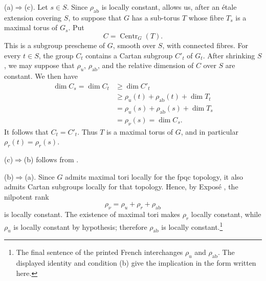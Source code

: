 \textup{(a)}\(\Rightarrow\)\textup{(c)}.
Let \(s\in S\). Since \(\rho_{\mathrm{ab}}\) is locally constant,
 allows us, after an étale extension covering \(S\),
to suppose that \(G\) has a sub-torus \(T\) whose fibre \(T_s\) is
a maximal torus of \(G_s\). Put
\[
  C=\operatorname{Centr}_G(T).
\]
This is a subgroup prescheme of \(G\), smooth over \(S\), with
connected fibres. For every \(t\in S\), the group \(C_t\) contains
a Cartan subgroup \(C'_t\) of \(G_t\). After shrinking \(S\), we
may suppose that \(\rho_u\), \(\rho_{\mathrm{ab}}\), and the
relative dimension of \(C\) over \(S\) are constant. We then have
\[
\begin{aligned}
  \dim C_s=\dim C_t
  &\geq \dim C'_t\\
  &\geq \rho_u(t)+\rho_{\mathrm{ab}}(t)+\dim T_t\\
  &=\rho_u(s)+\rho_{\mathrm{ab}}(s)+\dim T_s\\
  &=\rho_\nu(s)=\dim C_s.
\end{aligned}
\]
It follows that \(C_t=C'_t\). Thus \(T\) is a maximal torus of
\(G\), and in particular \(\rho_r(t)=\rho_r(s)\).

\textup{(c)}\(\Rightarrow\)\textup{(b)} follows from
.

\textup{(b)}\(\Rightarrow\)\textup{(a)}.
Since \(G\) admits maximal tori locally for the fpqc topology, it
also admits Cartan subgroups locally for that topology. Hence, by
Exposé , the nilpotent rank
\[
  \rho_\nu=\rho_u+\rho_r+\rho_{\mathrm{ab}}
\]
is locally constant. The existence of maximal tori makes
\(\rho_r\) locally constant, while \(\rho_u\) is locally constant
by hypothesis; therefore \(\rho_{\mathrm{ab}}\) is locally
constant.\footnote{The final sentence of the printed French
interchanges \(\rho_u\) and \(\rho_{\mathrm{ab}}\). The displayed
identity and condition \textup{(b)} give the implication in the
form written here.}



